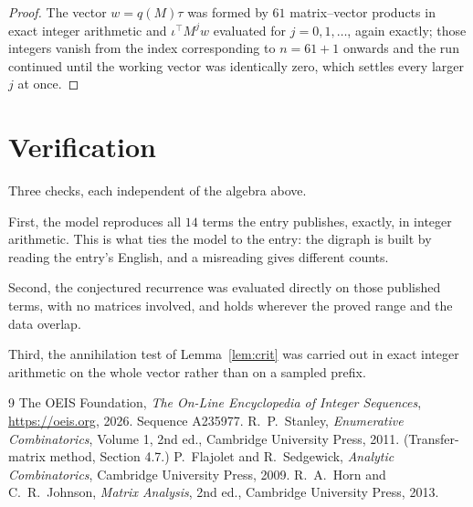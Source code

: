 \documentclass[11pt,a4paper]{article}
\theoremstyle{plain}
\theoremstyle{definition}
\begin{document}
\begin{proof}
The vector $w=q(M)\tau$ was formed by $61$ matrix--vector products in exact integer
arithmetic and $\iota^{\!\top}M^{j}w$ evaluated for $j=0,1,\dots$, again exactly; those
integers vanish from the index corresponding to $n=61+1$ onwards and the run continued
until the working vector was identically zero, which settles every larger $j$ at once.
\end{proof}

\section{Verification}

Three checks, each independent of the algebra above.

First, the model reproduces all $14$ terms the entry publishes, exactly, in integer
arithmetic. This is what ties the model to the entry: the digraph is built by reading the
entry's English, and a misreading gives different counts.

Second, the conjectured recurrence was evaluated directly on those published terms, with no
matrices involved, and holds wherever the proved range and the data overlap.

Third, the annihilation test of Lemma~\ref{lem:crit} was carried out in exact integer
arithmetic on the whole vector rather than on a sampled prefix.

\begin{thebibliography}{9}
 The OEIS Foundation, \emph{The On-Line Encyclopedia of Integer
Sequences}, \url{https://oeis.org}, 2026. Sequence A235977.
 R.~P.~Stanley, \emph{Enumerative Combinatorics}, Volume 1, 2nd ed.,
Cambridge University Press, 2011. (Transfer-matrix method, Section 4.7.)
 P.~Flajolet and R.~Sedgewick, \emph{Analytic Combinatorics}, Cambridge
University Press, 2009.
 R.~A.~Horn and C.~R.~Johnson, \emph{Matrix Analysis}, 2nd ed., Cambridge
University Press, 2013.
\end{thebibliography}
\end{document}
